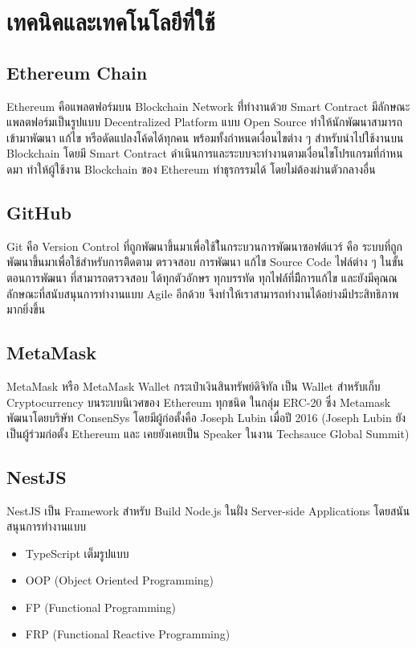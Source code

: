 \documentclass[12pt,oneside,openright,a4paper]{cpe-thai-project}
\begin{document}
\section{เทคนิคและเทคโนโลยีที่ใช้}

\subsection{Ethereum Chain  \cite{eth}} 
\tab Ethereum คือแพลตฟอร์มบน Blockchain Network ที่่ทํางานด้วย Smart Contract มีลักษณะแพลตฟอร์มเป็นรูปแบบ Decentralized Platform แบบ Open Source ทําให้นักพัฒนาสามารถเข้ามาพัฒนา แก้ไข หรือดัดแปลงโค้ดได้ทุกคน พร้อมทั้งกําหนดเงื่อนไขต่าง ๆ สําหรับนําไปใช้งานบน Blockchain โดยมี Smart Contract ดําเนินการและระบบจะทํางานตามเงื่อนไขโปรแกรมที่กําหนดมา ทําให้ผู้ใช้งาน Blockchain ของ Ethereum ทําธุรกรรมได้ โดยไม่ต้องผ่านตัวกลางอื่น

\subsection{GitHub  \cite{github}}
\tab Git คือ Version Control ที่ถูกพัฒนาขึ้นมาเพื่อใช้ใ้นกระบวนการพัฒนาซอฟต์แวร์ คือ ระบบที่ถูกพัฒนาขึ้นมาเพื่อใช้สำหรับการติิดตาม ตรวจสอบ การพัฒนา แก้ไข Source Code ไฟล์ต่าง ๆ ในขั้นตอนการพัฒนา ที่สามารถตรวจสอบ ได้ทุกตัวอักษร ทุกบรรทัด ทุกไฟล์์ที่มีีการแก้ไข และยังมีคุณณลักษณะที่สนับสนุนการทำงานแบบ Agile อีกด้วย จึงทำให้เราสามารถทำงานได้อย่างมีประสิทธิภาพมากยิ่งขึ้น

\subsection{MetaMask \cite{metamask}}
\tab MetaMask หรือ MetaMask Wallet กระเป๋าเงินสินทรัพย์ดิจิทัล เป็น Wallet สำหรับเก็บ Cryptocurrency บนระบบนิเวศของ Ethereum ทุกชนิด ในกลุ่ม ERC-20 ซึ่ง Metamask พัฒนาโดยบริษัท ConsenSys โดยมีผู้ก่อตั้งคือ Joseph Lubin เมื่อปี 2016 (Joseph Lubin ยังเป็นผู้ร่วมก่อตั้ง Ethereum และ เคยยังเคยเป็น Speaker ในงาน Techsauce Global Summit)

\subsection{NestJS \cite{nestjs}}
\tab NestJS เป็น Framework สำหรับ Build Node.js ในฝั่ง Server-side Applications โดยสนันสนุนการทำงานแบบ
	\begin{itemize}[leftmargin=0pt,itemindent=2.5cm]
		\item TypeScript เต็มรูปแบบ
		\item OOP (Object Oriented Programming)
		\item FP (Functional Programming)
		\item FRP (Functional Reactive Programming)
	\end{itemize}
\end{document}
